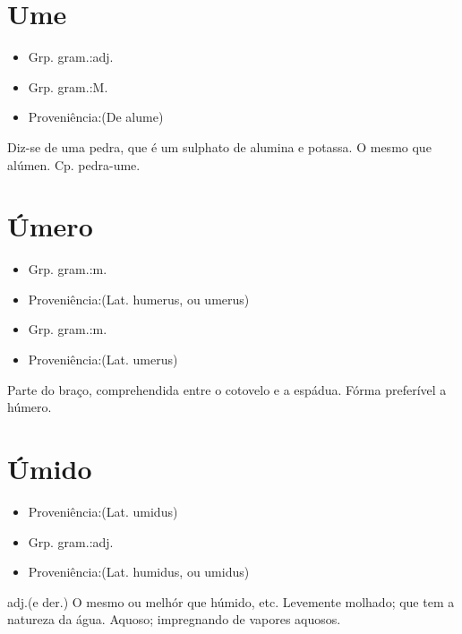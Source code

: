 \documentclass{article}
\begin{document}
\section{Ume}
\begin{itemize}
\item {Grp. gram.:adj.}
\end{itemize}
\begin{itemize}
\item {Grp. gram.:M.}
\end{itemize}
\begin{itemize}
\item {Proveniência:(De \textunderscore alume\textunderscore )}
\end{itemize}
Diz-se de uma pedra, que é um sulphato de alumina e potassa.
O mesmo que \textunderscore alúmen\textunderscore .
Cp. \textunderscore pedra-ume\textunderscore .
\section{Úmero}
\begin{itemize}
\item {Grp. gram.:m.}
\end{itemize}
\begin{itemize}
\item {Proveniência:(Lat. \textunderscore humerus\textunderscore , ou \textunderscore umerus\textunderscore )}
\end{itemize}
\begin{itemize}
\item {Grp. gram.:m.}
\end{itemize}
\begin{itemize}
\item {Proveniência:(Lat. \textunderscore umerus\textunderscore )}
\end{itemize}
Parte do braço, comprehendida entre o cotovelo e a espádua.
Fórma preferível a \textunderscore húmero\textunderscore .
\section{Úmido}
\begin{itemize}
\item {Proveniência:(Lat. \textunderscore umidus\textunderscore )}
\end{itemize}
\begin{itemize}
\item {Grp. gram.:adj.}
\end{itemize}
\begin{itemize}
\item {Proveniência:(Lat. \textunderscore humidus\textunderscore , ou \textunderscore umidus\textunderscore )}
\end{itemize}
\textunderscore adj.\textunderscore  (e der.)
O mesmo ou melhór que \textunderscore húmido\textunderscore , etc.
Levemente molhado; que tem a natureza da água.
Aquoso; impregnando de vapores aquosos.
\end{document}
